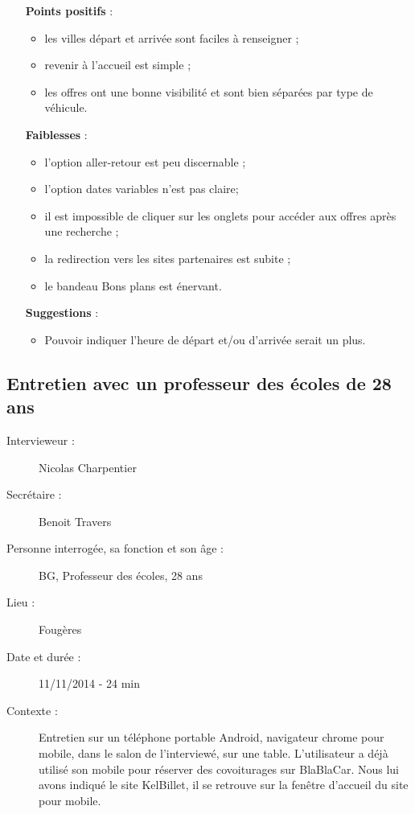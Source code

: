 \begin{itemize}
  \item [\textbf{Points positifs}] :
      \begin{itemize}
        \item les villes d\'{e}part et arriv\'{e}e sont faciles \`{a} renseigner ;
        \item revenir \`{a} l'accueil est simple ;
        \item les offres ont une bonne visibilit\'{e} et sont bien s\'{e}par\'{e}es par type de v\'{e}hicule.
      \end{itemize}
      
  \item [\textbf{Faiblesses}] :
      \begin{itemize}
        \item l'option aller-retour est peu discernable ;
        \item l'option dates variables n'est pas claire;
        \item il est impossible de cliquer sur les onglets pour acc\'{e}der aux offres apr\`{e}s une recherche ;
        \item la redirection vers les sites partenaires est subite ;
        \item le bandeau \og{}Bons plans\fg{} est \'{e}nervant.
      \end{itemize}
      
  \item [\textbf{Suggestions}] :
      \begin{itemize}
      	\item Pouvoir indiquer l'heure de d\'{e}part et/ou d'arriv\'{e}e serait un plus.
      \end{itemize}
\end{itemize}




\subsection{Entretien avec un professeur des \'{e}coles de 28 ans}

\begin{description}
\item [Intervieweur :] Nicolas Charpentier
\item [Secr\'{e}taire :] Benoit Travers
\item [Personne interrog\'{e}e, sa fonction et son \^{a}ge :] BG, Professeur des \'{e}coles, 28 ans
\item [Lieu :] Foug\`{e}res
\item [Date et dur\'{e}e :] 11/11/2014 - 24 min
\item [Contexte :] Entretien sur un t\'{e}l\'{e}phone portable Android, navigateur chrome pour mobile, dans le salon de l'interview\'{e}, sur une table. L'utilisateur a d\'{e}j\`{a} utilis\'{e} son mobile pour r\'{e}server des covoiturages sur BlaBlaCar. Nous lui avons indiqu\'{e} le site KelBillet, il se retrouve sur la fen\^{e}tre d'accueil du site pour mobile.
\end{description}


